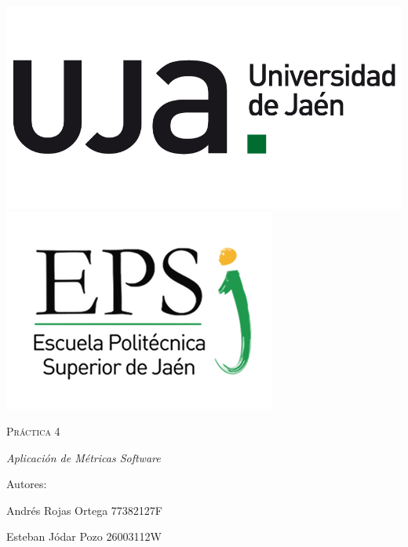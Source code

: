 	\begin{titlepage}
		\centering
		{\includegraphics[scale=0.2]{img/np_UJA_generica_6.png}
		\includegraphics[scale=0.35]{img/Logo_EPS.png}}
		\vspace{1cm}
		{\scshape\Huge Práctica 4 \par}
		\vspace{3cm}
		{\itshape\Large Aplicación de Métricas Software \par}
		\vfill
		{\Large Autores: \par}
		{\Large Andrés Rojas Ortega 77382127F\par}
		{\Large Esteban Jódar Pozo 26003112W\par}
		\vfill
	\end{titlepage}

	\paragraph{}
	\paragraph{}
	
	\tableofcontents
	
	\newpage
